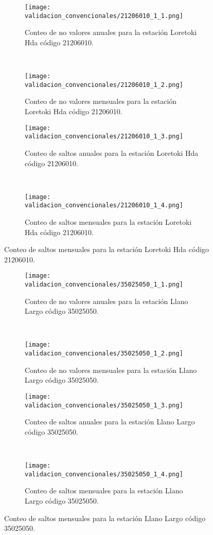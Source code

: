 \begin{figure}[H]\ContinuedFloat
\centering
	\begin{subfigure}[normla]{0.4\textwidth}
	\texttt{[image: validacion\_convencionales/21206010\_1\_1.png]}
		\caption{Conteo de no valores anuales para la estación Loretoki Hda código 21206010.}
		\label{subfig:a1}
		\end{subfigure}
		~
    \begin{subfigure}[normla]{0.4\textwidth}
	\texttt{[image: validacion\_convencionales/21206010\_1\_2.png]}
		\caption{Conteo de no valores mensuales para la estación Loretoki Hda código 21206010.}
		\label{subfig:a2}
		\end{subfigure}
		
    \begin{subfigure}[normla]{0.4\textwidth}
	\texttt{[image: validacion\_convencionales/21206010\_1\_3.png]}
		\caption{Conteo de saltos anuales para la estación Loretoki Hda código 21206010.}
		\label{subfig:a1}
		\end{subfigure}
		~
    \begin{subfigure}[normla]{0.4\textwidth}
	\texttt{[image: validacion\_convencionales/21206010\_1\_4.png]}
		\caption{Conteo de saltos mensuales para la estación Loretoki Hda código 21206010.}
		\label{subfig:a2}
		\end{subfigure}

	
\end{figure}
           
           
\begin{figure}[H]
	\centering
	\begin{subfigure}[normla]{0.4\textwidth}
	\texttt{[image: validacion\_convencionales/35025050\_1\_1.png]}
		\caption{Conteo de no valores anuales para la estación Llano Largo código 35025050.}
		\label{subfig:a1}
		\end{subfigure}
		~
    \begin{subfigure}[normla]{0.4\textwidth}
	\texttt{[image: validacion\_convencionales/35025050\_1\_2.png]}
		\caption{Conteo de no valores mensuales para la estación Llano Largo código 35025050.}
		\label{subfig:a2}
		\end{subfigure}
		
    \begin{subfigure}[normla]{0.4\textwidth}
	\texttt{[image: validacion\_convencionales/35025050\_1\_3.png]}
		\caption{Conteo de saltos anuales para la estación Llano Largo código 35025050.}
		\label{subfig:a1}
		\end{subfigure}
		~
    \begin{subfigure}[normla]{0.4\textwidth}
	\texttt{[image: validacion\_convencionales/35025050\_1\_4.png]}
		\caption{Conteo de saltos mensuales para la estación Llano Largo código 35025050.}
		\label{subfig:a2}
		\end{subfigure}

	
\end{figure}
           

